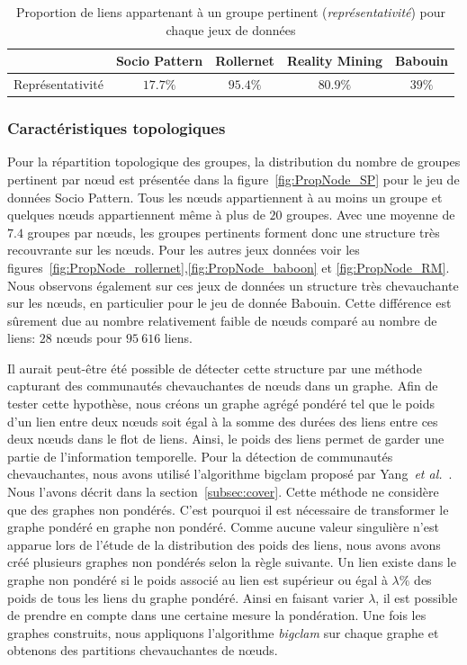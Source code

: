 \begin{table}
\centering
\begin{tabular}{|c|c|c|c|c|}
\hline \rule[-1ex]{0pt}{3.5ex}
 & Socio Pattern & Rollernet  & Reality Mining & Babouin \\
\hline
Représentativité & $17.7\%$ & $95.4\%$ & $80.9\%$ & $39\%$ \\

\hline
\end{tabular}
\caption{Proportion de liens appartenant à un groupe pertinent (\emph{représentativité}) pour chaque jeux de données}
\label{tab:res_representativite}       %
\end{table}


\subsubsection{Caractéristiques topologiques}
Pour la répartition topologique des groupes, la distribution du nombre de groupes pertinent par n\oe ud est présentée dans la figure~\ref{fig:PropNode_SP} pour le jeu de données Socio Pattern.
Tous les n\oe uds appartiennent à au moins un groupe et quelques n\oe uds appartiennent même à plus de $20$ groupes.
Avec une moyenne de $7.4$ groupes par n\oe uds, les groupes pertinents forment donc une structure très recouvrante sur les n\oe uds.
Pour les autres jeux données voir les figures~\ref{fig:PropNode_rollernet},\ref{fig:PropNode_baboon} et \ref{fig:PropNode_RM}.
Nous observons également sur ces jeux de données un structure très chevauchante sur les n\oe uds, en particulier pour le jeu de donnée Babouin.
Cette différence est sûrement due au nombre relativement faible de n\oe uds comparé au nombre de liens: $28$ n\oe uds pour $95\ 616$ liens.

\bigskip

Il aurait peut-être été possible de détecter cette structure par une méthode capturant des communautés chevauchantes de n\oe uds dans un graphe.
Afin de tester cette hypothèse, nous créons un graphe agrégé pondéré tel que le poids d'un lien entre deux n\oe uds soit égal à la somme des durées des liens entre ces deux n\oe uds dans le flot de liens.
Ainsi, le poids des liens permet de garder une partie de l'information temporelle.
Pour la détection de communautés chevauchantes, nous avons utilisé l'algorithme bigclam proposé par Yang~\emph{et al.}~\cite{Yang2013}.
Nous l'avons décrit dans la section~\ref{subsec:cover}.
Cette méthode ne considère que des graphes non pondérés.
C'est pourquoi il est nécessaire de transformer le graphe pondéré en graphe non pondéré.
Comme aucune valeur singulière n'est apparue lors de l'étude de la distribution des poids des liens, nous avons avons créé plusieurs graphes non pondérés selon la règle suivante.
Un lien existe dans le graphe non pondéré si le poids associé au lien est supérieur ou égal à $\lambda\%$ des poids de tous les liens du graphe pondéré.
Ainsi en faisant varier $\lambda$, il est possible de prendre en compte dans une certaine mesure la pondération.
Une fois les graphes construits, nous appliquons l'algorithme \emph{bigclam} sur chaque graphe et obtenons des partitions chevauchantes de n\oe uds.

